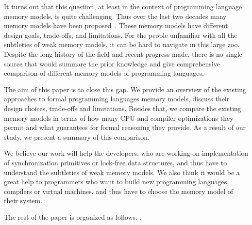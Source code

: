 It turns out that this question, 
at least in the context of programming language 
memory models, is quite challenging. 
Thus over the last two decades many memory models have been proposed~\cite{
Manson-al:POPL05, Batty-al:POPL11, Batty-el:POPL16, 
Dolan-al:PLDI18, Watt-el:OOPSLA19, Watt-el:PLDI2020, 
Jeffrey-Riely:LICS16, PichonPharabod-Sewell:POPL16, 
Podkopaev-al:CoRR16, Kang-al:POPL17, Chakraborty-Vafeiadis:POPL19, 
Paviotti-el:ESOP20, Lee-el:PLDI20}. 
These memory models have different design goals, trade-offs, and limitations.
For the people unfamiliar with all the subtleties 
of weak memory models, it can be hard to navigate in this large zoo.
Despite the long history of the field and recent progress made, 
there is no single source that would summare the prior knowledge
and give comprehensive comparison of different memory models
of programming languages.

The aim of this paper is to close this gap.
We provide an overview of the existing approaches to 
formal programming languages memory models,
discuss their design choices, trade-offs and limitations.
Besides that, we compare the existing memory models 
in terms of how many CPU and compiler optimizations 
they permit and what guarantees for formal reasoning they provide.
As a result of our study, we present a summary of this comparison.

We believe our work will help the developers,
who are working on implementation of synchronization primitives
or lock-free data structures, and thus have to understand 
the subtleties of weak memory models.
We also think it would be a great help to 
programmers who want to build new 
programming languages, compilers or virtual machines,
and thus have to choose the memory model of their system. 

The rest of the paper is organized as follows.
\todo{}.

